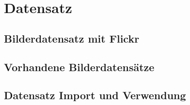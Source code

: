 \chapter{Datensatz}\label{chp:datensatz} %
\glsresetall

\section{Bilderdatensatz mit Flickr} %

\section{Vorhandene Bilderdatensätze}%

\section{Datensatz Import und Verwendung}%